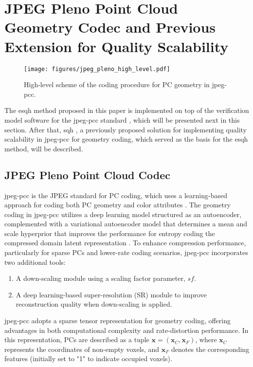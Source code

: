 \section{JPEG Pleno Point Cloud Geometry Codec and Previous Extension for Quality Scalability}
\label{sec:vm}

\begin{figure*}
    \centering
    \texttt{[image: figures/jpeg\_pleno\_high\_level.pdf]}
    \caption{High-level scheme of the coding procedure for PC geometry in \gls{jpeg-pcc}.}
    \label{fig:high-level-scheme}
\end{figure*}

\label{sec:jpegpleno}
The \gls{esqh} method proposed in this paper is implemented on top of the verification model software for the \gls{jpeg-pcc} standard \cite{jpeg-pleno}, which will be presented next in this section. After that, \gls{sqh} \cite{mari2024point}, a previously proposed solution for implementing quality scalability in \gls{jpeg-pcc} for geometry coding, which served as the basis for the \gls{esqh} method, will be described.

\subsection{JPEG Pleno Point Cloud Codec}

\gls{jpeg-pcc} is the JPEG standard for PC coding, which uses a learning-based approach for coding both PC geometry and color attributes \cite{guarda2023point}.
The geometry coding in \gls{jpeg-pcc} utilizes a deep learning model structured as an autoencoder, complemented with a variational autoencoder model that determines a mean and scale hyperprior that improves the performance for entropy coding the compressed domain latent representation \cite{minnen2018joint}. To enhance compression performance, particularly for sparse PCs and lower-rate coding scenarios, \gls{jpeg-pcc} incorporates two additional tools:
\begin{enumerate}
    \item A down-scaling module using a scaling factor parameter, $sf$.
    \item A deep learning-based super-resolution (SR) module to improve reconstruction quality when down-scaling is applied.
\end{enumerate}

\gls{jpeg-pcc} adopts a sparse tensor representation \cite{choy20194d} for geometry coding, offering advantages in both computational complexity and rate-distortion performance. In this representation, PCs are described as a tuple $\bm{x}=(\bm{x}_C, \bm{x}_F)$, where $\bm{x}_C$ represents the coordinates of non-empty voxels, and $\bm{x}_{F}$ denotes the corresponding features (initially set to "1" to indicate occupied voxels).

